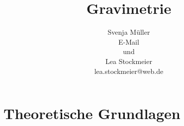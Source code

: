 \documentclass{include/protokollclass}
\author{Svenja Müller \\ E-Mail
\\und\\
Lea Stockmeier \\ lea.stockmeier@web.de}
\title{Gravimetrie}
\begin{document}

    \maketitle


    \begingroup \let\clearpage\relax    %
    \tableofcontents                    %
    \listoffigures
    \endgroup



    \MainMatter
    
    
    \chapter{Theoretische Grundlagen}
    




    \TheBibliography

    
    

\end{document}
